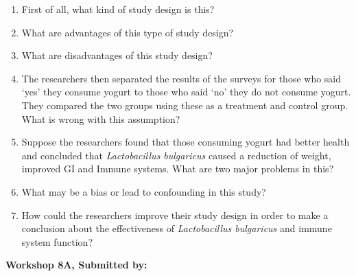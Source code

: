 \documentclass[11pt, chapterprefix=true]{scrbook}\usepackage[]{graphicx}\usepackage[]{color}
\begin{document}
\begin{exercises}
\begin{exercise}
\begin{enumerate}
  \item First of all, what kind of study design is this?
  \item What are advantages of this type of study design?
  \item What are disadvantages of this study design?
  \item	The researchers then separated the results of the surveys for those who said `yes' they consume yogurt to those who said `no' they do not consume yogurt.  They compared the two groups using these as a treatment and control group.  What is wrong with this assumption?
  \item	Suppose the researchers found that those consuming yogurt had better health and concluded that \textit{Lactobacillus bulgaricus} caused a reduction of weight, improved GI and Immune systems.  What are two major problems in this?
  \item	What may be a bias or lead to confounding in this study?
  \item	How could the researchers improve their study design in order to make a conclusion about the effectiveness of \textit{Lactobacillus bulgaricus} and immune system function?
\end{enumerate}

\end{exercise}
\begin{solution}  %

\end{solution}

\clearpage

    \begin{exercise}  %

    \begin{center}
\begin{flushleft}\textbf{\large \hfill Workshop 8A, Submitted by: }\end{flushleft}

\end{center}
\end{exercise}
\end{exercises}
\end{document}
